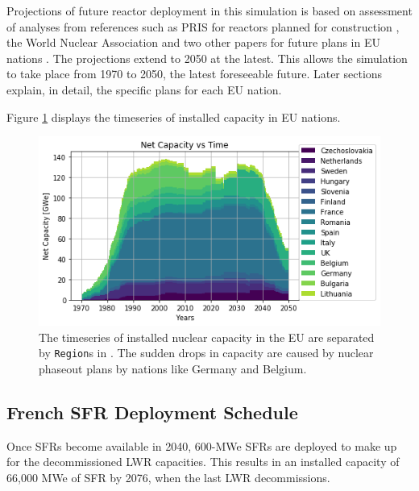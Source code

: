 Projections of future reactor deployment in this simulation is based on assessment of analyses
from references such as \gls{PRIS} for reactors planned for construction \cite{iaea_nuclear_2017},
the World Nuclear Association and two other papers for future plans in EU nations
\cite{world_nuclear_association_nuclear_2017, joskow_future_2012, hatch_politics_2015}.
The projections extend to 2050 at the latest. This allows the simulation to take place from
1970 to 2050, the latest foreseeable future. Later sections explain, in detail, the specific plans for each \gls{EU} nation.

Figure \ref{fig:eu_pow} displays the
timeseries of installed capacity in \gls{EU} nations.

\begin{figure}[htbp!]
	\begin{center}
		\includegraphics[scale=0.7]{./images/eu_future/power_plot.png}
	\end{center}
	\caption{The timeseries of installed nuclear capacity in the EU are separated by \texttt{Region}s in \Cyclus.
			 The sudden drops in capacity are caused by nuclear phaseout plans by nations like Germany and Belgium.
			 }
	\label{fig:eu_pow}
\end{figure}
\FloatBarrier

\subsection{French \gls{SFR} Deployment Schedule}

Once \glspl{SFR} become available in 2040,
600-MWe \glspl{SFR} are deployed to make up for the 
decommissioned \gls{LWR} capacities. 
This results in an installed capacity of 66,000 MWe
of \gls{SFR} by 2076, when the last \gls{LWR} decommissions.


